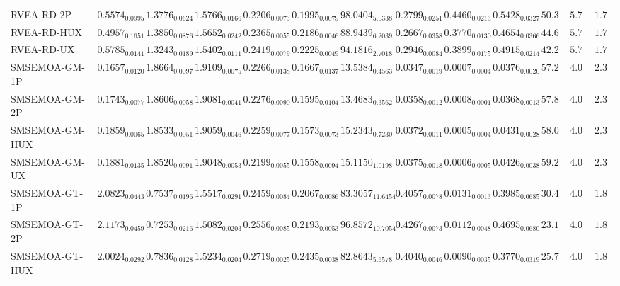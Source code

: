 \documentclass[11pt,a4paper]{article}
\begin{document}
\begin{table}[H]
{\begin{tabular}{lcccccccccccc}
RVEA-RD-2P & $0.5574_{0.0995}$ & $1.3776_{0.0624}$ & $1.5766_{0.0166}$ & $0.2206_{0.0073}$ & $0.1995_{0.0079}$ & $98.0404_{5.0338}$ & $0.2799_{0.0251}$ & $0.4460_{0.0213}$ & $0.5428_{0.0327}$ & $50.33$ & $5.78$ & $\mathbf{1.78}$ \\
RVEA-RD-HUX & $0.4957_{0.1651}$ & $1.3850_{0.0876}$ & $1.5652_{0.0242}$ & $0.2365_{0.0055}$ & $0.2186_{0.0046}$ & $88.9439_{6.2039}$ & $0.2667_{0.0358}$ & $0.3770_{0.0130}$ & $0.4654_{0.0366}$ & $44.67$ & $5.78$ & $\mathbf{1.78}$ \\
RVEA-RD-UX & $0.5785_{0.0141}$ & $1.3243_{0.0189}$ & $1.5402_{0.0111}$ & $0.2419_{0.0079}$ & $0.2225_{0.0049}$ & $94.1816_{2.7018}$ & $0.2946_{0.0084}$ & $0.3899_{0.0175}$ & $0.4915_{0.0214}$ & $42.22$ & $5.78$ & $\mathbf{1.78}$ \\
SMSEMOA-GM-1P & $0.1657_{0.0120}$ & $1.8664_{0.0097}$ & $1.9109_{0.0075}$ & $0.2266_{0.0138}$ & $0.1667_{0.0137}$ & $13.5384_{0.4563}$ & $0.0347_{0.0019}$ & $0.0007_{0.0004}$ & $0.0376_{0.0020}$ & $57.22$ & $4.00$ & $2.33$ \\
SMSEMOA-GM-2P & $0.1743_{0.0077}$ & $1.8606_{0.0058}$ & $1.9081_{0.0041}$ & $0.2276_{0.0090}$ & $0.1595_{0.0104}$ & $13.4683_{0.3562}$ & $0.0358_{0.0012}$ & $0.0008_{0.0001}$ & $0.0368_{0.0013}$ & $57.89$ & $4.00$ & $2.33$ \\
SMSEMOA-GM-HUX & $0.1859_{0.0065}$ & $1.8533_{0.0051}$ & $1.9059_{0.0046}$ & $0.2259_{0.0077}$ & $0.1573_{0.0073}$ & $15.2343_{0.7230}$ & $0.0372_{0.0011}$ & $0.0005_{0.0004}$ & $0.0431_{0.0028}$ & $58.00$ & $4.00$ & $2.33$ \\
SMSEMOA-GM-UX & $0.1881_{0.0135}$ & $1.8520_{0.0091}$ & $1.9048_{0.0053}$ & $0.2199_{0.0055}$ & $0.1558_{0.0094}$ & $15.1150_{1.0198}$ & $0.0375_{0.0018}$ & $0.0006_{0.0005}$ & $0.0426_{0.0038}$ & $59.22$ & $4.00$ & $2.33$ \\
SMSEMOA-GT-1P & $2.0823_{0.0443}$ & $0.7537_{0.0196}$ & $1.5517_{0.0291}$ & $0.2459_{0.0084}$ & $0.2067_{0.0086}$ & $83.3057_{11.6454}$ & $0.4057_{0.0078}$ & $0.0131_{0.0013}$ & $0.3985_{0.0685}$ & $30.44$ & $4.00$ & $1.89$ \\
SMSEMOA-GT-2P & $2.1173_{0.0459}$ & $0.7253_{0.0216}$ & $1.5082_{0.0203}$ & $0.2556_{0.0085}$ & $0.2193_{0.0053}$ & $96.8572_{10.7054}$ & $0.4267_{0.0073}$ & $0.0112_{0.0048}$ & $0.4695_{0.0680}$ & $\mathbf{23.11}$ & $4.00$ & $1.89$ \\
SMSEMOA-GT-HUX & $2.0024_{0.0292}$ & $0.7836_{0.0128}$ & $1.5234_{0.0204}$ & $\mathbf{0.2719}_{0.0025}$ & $\mathbf{0.2435}_{0.0038}$ & $82.8643_{5.6578}$ & $0.4040_{0.0046}$ & $0.0090_{0.0035}$ & $0.3770_{0.0319}$ & $25.78$ & $4.00$ & $1.89$ \\

\end{tabular}}
\end{table}
\end{document}
